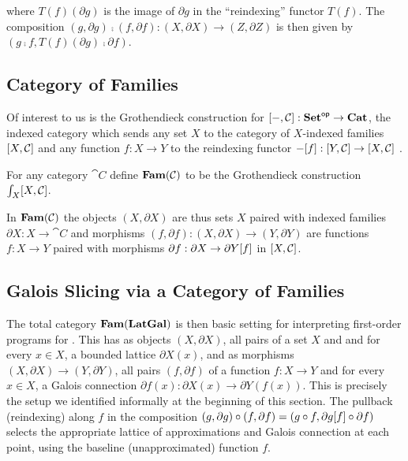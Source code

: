 \noindent where $T(f)(\partial g)$ is the image of $\partial g$ in the ``reindexing'' functor $T(f)$. The
composition $(g, \partial g) \comp (f, \partial f): (X, \partial X) \to (Z, \partial Z)$ is then given by $(g
\comp f, T(f)(\partial g) \comp \partial f)$.

\subsection{Category of Families}
\label{sec:Fam}

Of interest to us is the Grothendieck construction for $[-,\mathcal{C}]: \mathbf{Set}^{\mathsf{op}} \to \mathbf{Cat}$, the indexed
category which sends any set $X$ to the category of $X$-indexed families $[X,\mathcal{C}]$ and any function
$f: X \to Y$ to the reindexing functor $-[f]: [Y,\mathcal{C}] \to [X,\mathcal{C}]$ .

\begin{definition}
\label{def:Fam}
For any category $\cat{C}$ define $\mathbf{Fam}(\mathcal{C})$ to be the Grothendieck construction
$\int_{X}[X,\mathcal{C}]$.
\end{definition}

\noindent In $\mathbf{Fam}(\mathcal{C})$ the objects $(X, \partial X)$ are thus sets $X$ paired with indexed families
$\partial X: X \to \cat{C}$ and morphisms $(f, \partial f): (X, \partial X) \to (Y, \partial Y)$ are functions
$f: X \to Y$ paired with morphisms $\partial f: \partial X \to \partial Y[f]$ in
$[X,\mathcal{C}]$.

\subsection{Galois Slicing via a Category of Families}

The total category $\mathbf{Fam}(\mathbf{LatGal})$ is then basic setting for interpreting first-order programs for \GPS. This
has as objects $(X, \partial X)$, all pairs of a set $X$ and and for every $x \in X$, a bounded lattice
$\partial X(x)$, and as morphisms $(X, \partial X) \to (Y, \partial Y)$, all pairs $(f, \partial f)$ of a
function $f: X \to Y$ and for every $x \in X$, a Galois connection $\partial f(x): \partial X(x) \to \partial
Y(f(x))$. This is precisely the setup we identified informally at the beginning of this section. The pullback
(reindexing) along $f$ in the composition $(g, \partial g) \circ (f, \partial f) = (g \circ f,
\partial g[f] \circ \partial f)$ selects the appropriate lattice of approximations and Galois
connection at each point, using the baseline (unapproximated) function $f$.


